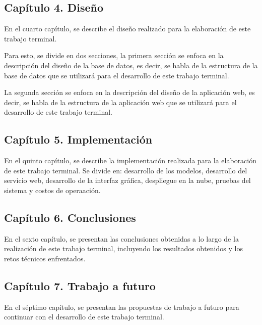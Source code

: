 \subsection*{Capítulo 4. Diseño}

En el cuarto capítulo, se describe el diseño realizado para la elaboración de
este trabajo terminal.

Para esto, se divide en dos secciones, la primera sección se enfoca en la
descripción del diseño de la base de datos, es decir, se habla de la estructura
de la base de datos que se utilizará para el desarrollo de este trabajo terminal.

La segunda sección se enfoca en la descripción del diseño de la aplicación web,
es decir, se habla de la estructura de la aplicación web que se utilizará para
el desarrollo de este trabajo terminal.

\subsection*{Capítulo 5. Implementación}

En el quinto capítulo, se describe la implementación realizada para la elaboración
de este trabajo terminal. Se divide en: desarrollo de los modelos, desarrollo del
servicio web, desarrollo de la interfaz gráfica, despliegue en la nube, pruebas
del sistema y costos de operaación.

\subsection*{Capítulo 6. Conclusiones}

En el sexto capítulo, se presentan las conclusiones obtenidas a lo largo de la
realización de este trabajo terminal, incluyendo los resultados obtenidos y los
retos técnicos enfrentados.

\subsection*{Capítulo 7. Trabajo a futuro}

En el séptimo capítulo, se presentan las propuestas de trabajo a futuro para
continuar con el desarrollo de este trabajo terminal.

